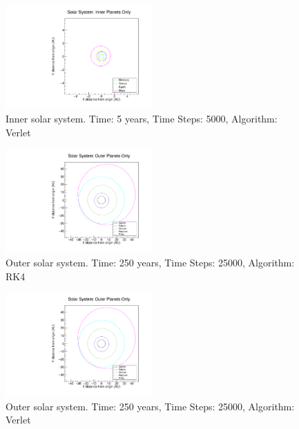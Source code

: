 \documentclass[a4paper,12pt]{report}
\begin{document}
   \begin{figure}
 \centering
   \includegraphics[width=0.5\textwidth]{inner_only_Verlet.pdf}
  \caption{Inner solar system. Time: 5 years, Time Steps: 5000, Algorithm: Verlet}
  \label{fig:inner_only_Verlet}
 \end{figure}
 
  \begin{figure}
 \centering
   \includegraphics[width=0.5\textwidth]{outer_only_RK4.pdf}
  \caption{Outer solar system. Time: 250 years, Time Steps: 25000, Algorithm: RK4}
  \label{fig:outer_only_RK4}
 \end{figure}
 
   \begin{figure}
 \centering
   \includegraphics[width=0.5\textwidth]{outer_only_Verlet.pdf}
  \caption{Outer solar system. Time: 250 years, Time Steps: 25000, Algorithm: Verlet}
  \label{fig:outer_only_Verlet}
 \end{figure}
 
\end{document}
